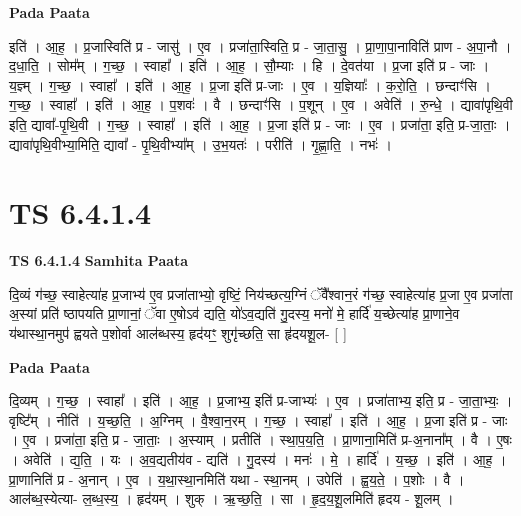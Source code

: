 \documentclass[17pt]{extarticle}
\begin{document}
\textbf{Pada Paata} \newline

इति॑ । आ॒ह॒ । प्र॒जास्विति॑ प्र - जासु॑ । ए॒व । प्रजा॑ता॒स्विति॒ प्र - जा॒ता॒सु॒ । प्रा॒णा॒पा॒नाविति॑ प्राण - अ॒पा॒नौ । द॒धा॒ति॒ । सोम᳚म् । ग॒च्छ॒ । स्वाहा᳚ । इति॑ । आ॒ह॒ । सौ॒म्याः । हि । दे॒वत॑या । प्र॒जा इति॑ प्र - जाः । य॒ज्ञ्म् । ग॒च्छ॒ । स्वाहा᳚ । इति॑ । आ॒ह॒ । प्र॒जा इति॑ प्र-जाः । ए॒व । य॒ज्ञियाः᳚ । क॒रो॒ति॒ । छन्दाꣳ॑सि । ग॒च्छ॒ । स्वाहा᳚ । इति॑ । आ॒ह॒ । प॒शवः॑ । वै । छन्दाꣳ॑सि । प॒शून् । ए॒व । अवेति॑ । रु॒न्धे॒ । द्यावा॑पृथि॒वी इति॒ द्यावा᳚-पृ॒थि॒वी । ग॒च्छ॒ । स्वाहा᳚ । इति॑ । आ॒ह॒ । प्र॒जा इति॑ प्र - जाः । ए॒व । प्रजा॑ता॒ इति॒ प्र-जा॒ताः॒ । द्यावा॑पृथि॒वीभ्या॒मिति॒ द्यावा᳚ - पृ॒थि॒वीभ्या᳚म् । उ॒भ॒यतः॑ । परीति॑ । गृ॒ह्णा॒ति॒ । नभः॑ ।  \newline





\section{ TS 6.4.1.4 }

\textbf{TS 6.4.1.4 } \newline
\textbf{Samhita Paata} \newline

दि॒व्यं ग॑च्छ॒ स्वाहेत्या॑ह प्र॒जाभ्य॑ ए॒व प्रजा॑ताभ्यो॒ वृष्टिं॒ निय॑च्छत्य॒ग्निं ॅवै᳚श्वान॒रं ग॑च्छ॒ स्वाहेत्या॑ह प्र॒जा ए॒व प्रजा॑ता अ॒स्यां प्रति॑ ष्ठापयति प्रा॒णानां॒ ॅवा ए॒षोऽव॑ द्यति॒ यो॑ऽव॒द्यति॑ गु॒दस्य॒ मनो॑ मे॒ हार्दि॑ य॒च्छेत्या॑ह प्रा॒णाने॒व य॑थास्था॒नमुप॑ ह्वयते प॒शोर्वा आल॑ब्धस्य॒ हृद॑यꣳ॒॒ शुगृ॑च्छति॒ सा हृ॑दयशू॒ल- [  ] \newline

\textbf{Pada Paata} \newline

दि॒व्यम् । ग॒च्छ॒ । स्वाहा᳚ । इति॑ । आ॒ह॒ । प्र॒जाभ्य॒ इति॑ प्र-जाभ्यः॑ । ए॒व । प्रजा॑ताभ्य॒ इति॒ प्र - जा॒ता॒भ्यः॒ । वृष्टि᳚म् । नीति॑ । य॒च्छ॒ति॒ । अ॒ग्निम् । वै॒श्वा॒न॒रम् । ग॒च्छ॒ । स्वाहा᳚ । इति॑ । आ॒ह॒ । प्र॒जा इति॑ प्र - जाः । ए॒व । प्रजा॑ता॒ इति॒ प्र - जा॒ताः॒ । अ॒स्याम् । प्रतीति॑ । स्था॒प॒य॒ति॒ । प्रा॒णाना॒मिति॑ प्र-अ॒नाना᳚म् । वै । ए॒षः । अवेति॑ । द्य॒ति॒ । यः । अ॒व॒द्यतीय॑व - द्यति॑ । गु॒दस्य॑ । मनः॑ । मे॒ । हार्दि॑ । य॒च्छ॒ । इति॑ । आ॒ह॒ । प्रा॒णानिति॑ प्र - अ॒नान् । ए॒व । य॒था॒स्था॒नमिति॑ यथा - स्था॒नम् । उपेति॑ । ह्व॒य॒ते॒ । प॒शोः । वै । आल॑ब्ध॒स्येत्या- ल॒ब्ध॒स्य॒ । हृद॑यम् । शुक् । ऋ॒च्छ॒ति॒ । सा । हृ॒द॒य॒शू॒लमिति॑ हृदय - शू॒लम् ।  \newline
\end{document}
